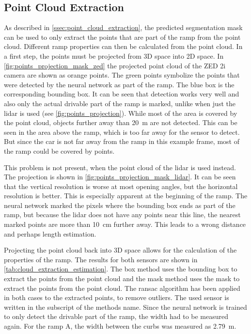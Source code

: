 \subsection{Point Cloud Extraction}
As described in \cref{ssec:point_cloud_extraction}, the predicted segmentation mask can be used to only extract the points that are part of the ramp from the point cloud.
Different ramp properties can then be calculated from the point cloud.
In a first step, the points must be projected from 3D space into 2D space.
In \cref{fig:points_projection_mask_zed} the projected point cloud of the ZED 2i camera are shown as orange points.
The green points symbolize the points that were detected by the neural network as part of the ramp.
The blue box is the corresponding bounding box.
It can be seen that detection works very well and also only the actual drivable part of the ramp is marked, unlike when just the \gls{lidar} is used (see \cref{fig:points_projection}).
While most of the area is covered by the point cloud, objects further away than \SI{20}{\metre} are not detected.
This can be seen in the area above the ramp, which is too far away for the sensor to detect.
But since the car is not far away from the ramp in this example frame, most of the ramp could be covered by points.

This problem is not present, when the point cloud of the \gls{lidar} is used instead.
The projection is shown in \cref{fig:points_projection_mask_lidar}.
It can be seen that the vertical resolution is worse at most opening angles, but the horizontal resolution is better.
This is especially apparent at the beginning of the ramp.
The neural network marked the pixels where the bounding box ends as part of the ramp, but because the \gls{lidar} does not have any points near this line, the nearest marked points are more than \SI{10}{\cm} further away.
This leads to a wrong distance and perhaps length estimation.

Projecting the point cloud back into 3D space allows for the calculation of the properties of the ramp.
The results for both sensors are shown in \cref{tab:cloud_extraction_estimation}.
The box method uses the bounding box to extract the points from the point cloud and the mask method uses the mask to extract the points from the point cloud.
The \gls{ransac} algorithm has been applied in both cases to the extracted points, to remove outliers.
The used sensor is written in the subscript of the methods name.
Since the neural network is trained to only detect the drivable part of the ramp, the width had to be measured again.
For the ramp A, the width between the curbs was measured as \SI{2.79}{\metre}.

